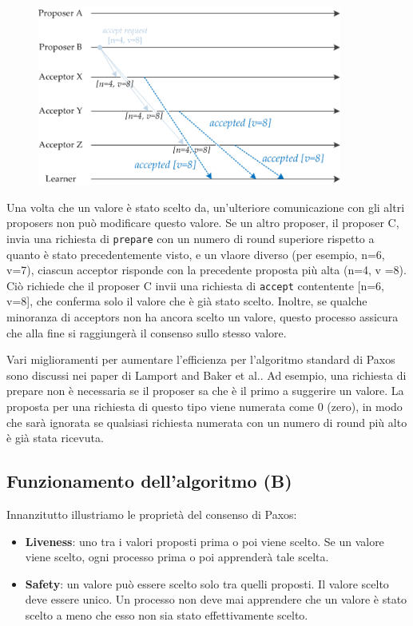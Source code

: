 \begin{figure}[ht]
    \centering
    \includegraphics[width=10cm]{./Images/cap2/2.11.png}
    \label{fig:image2.11}
\end{figure}

Una volta che un valore è stato scelto da, un’ulteriore comunicazione con gli altri proposers non può modificare questo valore. Se un altro proposer, il proposer C, invia una richiesta di \texttt{prepare} con un numero di round superiore rispetto a quanto è stato precedentemente visto, e un vlaore diverso (per esempio, n=6, v=7), ciascun acceptor risponde con la precedente proposta più alta (n=4, v =8). Ciò richiede che il proposer C invii una richiesta di \texttt{accept} contentente [n=6, v=8], che conferma solo il valore che è già stato scelto. Inoltre, se qualche minoranza di acceptors non ha ancora scelto un valore, questo processo assicura che alla fine si raggiungerà il consenso sullo stesso valore.

\vspace{5mm}

Vari miglioramenti per aumentare l’efficienza per l’algoritmo standard di Paxos sono discussi nei paper di Lamport and Baker et al.. Ad esempio, una richiesta di prepare non è necessaria se il proposer sa che è il primo a suggerire un valore. La proposta per una richiesta di questo tipo viene numerata come 0 (zero), in modo che sarà ignorata se qualsiasi richiesta numerata con un numero di round più alto è già stata ricevuta.

\subsection{Funzionamento dell'algoritmo (B)}
Innanzitutto illustriamo le proprietà del consenso di Paxos:
\begin{itemize}
    \item \textbf{Liveness}: uno tra i valori proposti prima o poi viene scelto. Se un valore viene scelto, ogni processo prima o poi apprenderà tale scelta.
    \item \textbf{Safety}: un valore può essere scelto solo tra quelli proposti. Il valore scelto deve essere unico. Un processo non deve mai apprendere che un valore è stato scelto a meno che esso non sia stato effettivamente scelto.
\end{itemize}
